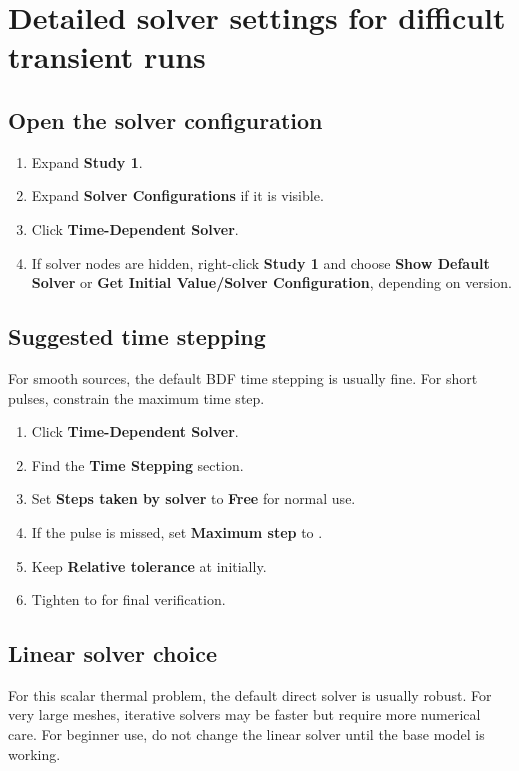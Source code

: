 \documentclass[11pt]{article}
\newcommand{\type}[1]{\texttt{\detokenize{#1}}}
\newcommand{\menu}[1]{\textbf{#1}}
\begin{document}
\section{Detailed solver settings for difficult transient runs}

\subsection{Open the solver configuration}
\begin{enumerate}
\item Expand \menu{Study 1}.
\item Expand \menu{Solver Configurations} if it is visible.
\item Click \menu{Time-Dependent Solver}.
\item If solver nodes are hidden, right-click \menu{Study 1} and choose \menu{Show Default Solver} or \menu{Get Initial Value/Solver Configuration}, depending on version.
\end{enumerate}

\subsection{Suggested time stepping}
For smooth sources, the default BDF time stepping is usually fine.  For short pulses, constrain the maximum time step.
\begin{enumerate}
\item Click \menu{Time-Dependent Solver}.
\item Find the \menu{Time Stepping} section.
\item Set \menu{Steps taken by solver} to \menu{Free} for normal use.
\item If the pulse is missed, set \menu{Maximum step} to \type{tpulse/10}.
\item Keep \menu{Relative tolerance} at \type{1e-4} initially.
\item Tighten to \type{1e-5} for final verification.
\end{enumerate}

\subsection{Linear solver choice}
For this scalar thermal problem, the default direct solver is usually robust.  For very large meshes, iterative solvers may be faster but require more numerical care.  For beginner use, do not change the linear solver until the base model is working.
\end{document}
